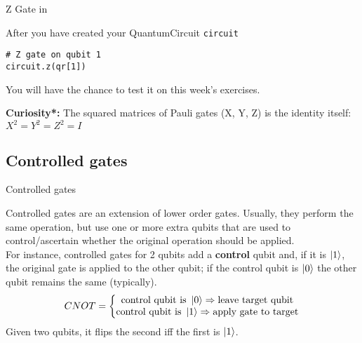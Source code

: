 \documentclass[aspectratio=43]{beamer}
\begin{document}
\begin{frame}[fragile]{Z Gate in \qk}
\begin{card}
    After you have created your QuantumCircuit \texttt{circuit}
    \begin{verbatim}
# Z gate on qubit 1
circuit.z(qr[1])
    \end{verbatim}
    \begin{center}
        
    \end{center}
    You will have the chance to test it on this week's exercises.
\end{card}
\begin{cardTiny}
    \textbf{Curiosity*: } The squared matrices of Pauli gates (X, Y, Z) is the identity itself: $X^2 = Y^2 = Z^2 = I$
\end{cardTiny}
\end{frame}



\subsection{Controlled gates}
\begin{frame}{Controlled gates}
\begin{card}
    Controlled gates are an extension of lower order gates. Usually, they perform the same operation, but use one or more extra qubits that are used to control/ascertain whether the original operation should be applied.\\
    For instance, controlled gates for 2 qubits add a \textbf{control} qubit and, if it is $\ket{1}$, the original gate is applied to the other qubit; if the control qubit is $\ket{0}$ the other qubit remains the same (typically).\\
    \begin{equation*}
        CNOT = \left\{\begin{matrix}
            \text{control qubit is } \ket{0} \Rightarrow \text{leave target qubit} \\ 
            \text{control qubit is } \ket{1} \Rightarrow \text{apply gate to target}
        \end{matrix}\right.
    \end{equation*}
    Given two qubits, it flips the second iff the first is $\ket{1}$.
\end{card}
\pagenumber
\end{frame}
\end{document}

